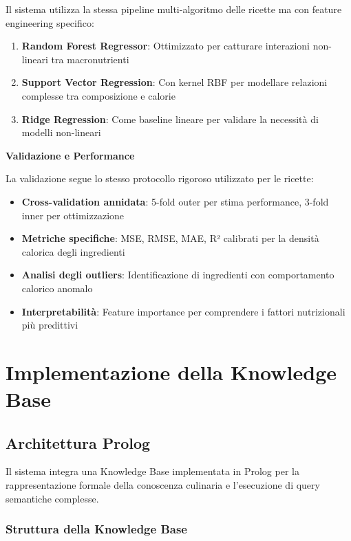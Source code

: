 \documentclass[12pt,a4paper]{article}
\begin{document}
Il sistema utilizza la stessa pipeline multi-algoritmo delle ricette ma con feature engineering specifico:

\begin{enumerate}
    \item \textbf{Random Forest Regressor}: Ottimizzato per catturare interazioni non-lineari tra macronutrienti
    \item \textbf{Support Vector Regression}: Con kernel RBF per modellare relazioni complesse tra composizione e calorie
    \item \textbf{Ridge Regression}: Come baseline lineare per validare la necessità di modelli non-lineari
\end{enumerate}

\textbf{Validazione e Performance}

La validazione segue lo stesso protocollo rigoroso utilizzato per le ricette:
\begin{itemize}
    \item \textbf{Cross-validation annidata}: 5-fold outer per stima performance, 3-fold inner per ottimizzazione
    \item \textbf{Metriche specifiche}: MSE, RMSE, MAE, R² calibrati per la densità calorica degli ingredienti
    \item \textbf{Analisi degli outliers}: Identificazione di ingredienti con comportamento calorico anomalo
    \item \textbf{Interpretabilità}: Feature importance per comprendere i fattori nutrizionali più predittivi
\end{itemize}

\section{Implementazione della Knowledge Base}

\subsection{Architettura Prolog}

Il sistema integra una Knowledge Base implementata in Prolog per la rappresentazione formale della conoscenza culinaria e l'esecuzione di query semantiche complesse.

\subsubsection{Struttura della Knowledge Base}
\end{document}
